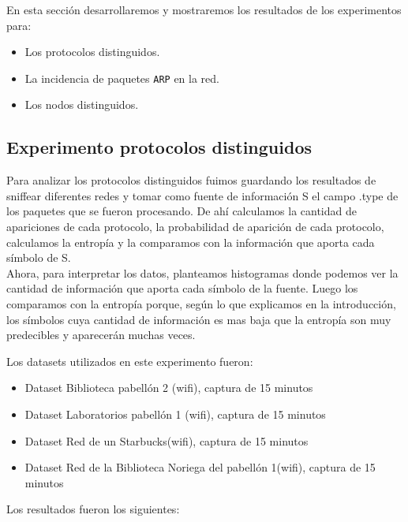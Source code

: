 En esta sección desarrollaremos y mostraremos los resultados de los experimentos para:

\begin{itemize}
\item Los protocolos distinguidos.
\item La incidencia de paquetes \texttt{ARP} en la red.
\item Los nodos distinguidos.
\end{itemize}

\subsection{Experimento protocolos distinguidos}

Para analizar los protocolos distinguidos fuimos guardando los resultados de sniffear diferentes redes y tomar como fuente de información S el campo .type de los paquetes que se fueron procesando. De ahí calculamos la cantidad de apariciones de cada protocolo, la probabilidad de aparición de cada protocolo, calculamos la entropía y la comparamos con la información que aporta cada símbolo de S.\\

Ahora, para interpretar los datos, planteamos histogramas donde podemos ver la cantidad de información que aporta cada símbolo de la fuente. Luego los comparamos con la entropía porque, según lo que explicamos en la introducción, los símbolos cuya cantidad de información es mas baja que la entropía son muy predecibles y aparecerán muchas veces. \\

\vspace{0.5em}

Los datasets utilizados en este experimento fueron:

\begin{itemize}
    \item Dataset Biblioteca pabellón 2 (wifi), captura de 15 minutos
    \item Dataset Laboratorios pabellón 1 (wifi), captura de 15 minutos
    \item Dataset Red de un Starbucks(wifi), captura de 15 minutos
    \item Dataset Red de la Biblioteca Noriega del pabellón 1(wifi), captura de 15 minutos
\end{itemize}

Los resultados fueron los siguientes: \\

